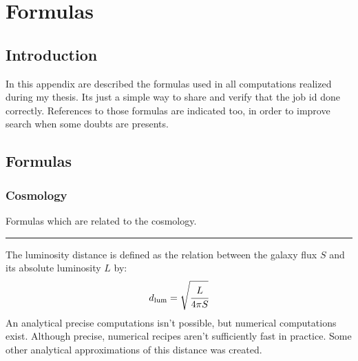 \chapter{Formulas}
\label{cha:formulas}

\section{Introduction}

In this appendix are described the formulas used in all computations realized
during my thesis. Its just a simple way to share and verify that the job id
done correctly. References to those formulas are indicated too, in order to
improve search when some doubts are presents.

\section{Formulas}

\subsection{Cosmology}

Formulas which are related to the cosmology.

\noindent\rule{\linewidth}{1pt}
%
The luminosity distance is defined as the relation between the galaxy flux $S$
and its absolute luminosity $L$ by:
%
\begin{equation}
	d_{\mathrm{lum}}=\sqrt{\cfrac{L}{4\pi{S}}}
\end{equation}
%
An analytical precise computations isn't possible, but numerical computations
exist. Although precise, numerical recipes aren't sufficiently fast in
practice. Some other analytical approximations of this distance was created.


